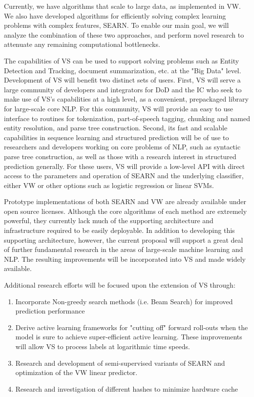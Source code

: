 Currently, we have algorithms that scale to large data, as implemented in \ac{VW}. We also have developed algorithms for efficiently solving complex learning problems with complex features, \ac{SEARN}. To enable our main goal, we will analyze the combination of these two approaches, and perform novel research to attenuate any remaining computational bottlenecks.

The capabilities of \ac{VS} can be used to support solving problems such as Entity Detection and Tracking, document summarization, etc. at the "Big Data" level. Development of \ac{VS} will benefit two distinct sets of users. First, \ac{VS} will serve a large community of developers and integrators for DoD and the IC who seek to make use of \ac{VS}'s capabilities at a high level, as a convenient, prepackaged library for large-scale core \ac{NLP}. For this community, \ac{VS} will provide an easy to use interface to routines for tokenization, part-of-speech tagging, chunking and named entity resolution, and parse tree construction. Second, its fast and scalable capabilities in sequence learning and structured prediction will be of use to researchers and developers working on core problems of \ac{NLP}, such as syntactic parse tree construction, as well as those with a research interest in structured prediction generally. For these users, \ac{VS} will provide a low-level \ac{API} with direct access to the parameters and operation of \ac{SEARN} and the underlying classifier, either \ac{VW} or other options such as logistic regression or linear \ac{SVM}s.


Prototype implementations of both \ac{SEARN} and \ac{VW} are already available under open source licenses. Although the core algorithms of each method are extremely powerful, they currently lack much of the supporting architecture and infrastructure required to be easily deployable. In addition to developing this supporting architecture, however, the current proposal will support a great deal of further fundamental research in the areas of large-scale machine learning and \ac{NLP}. The resulting improvements will be incorporated into \ac{VS} and made widely available. 

Additional research efforts will be focused upon the extension of VS through:

\begin{enumerate}
    \item Incorporate Non-greedy search methods (i.e. Beam Search) for improved prediction performance

    \item Derive active learning frameworks for "cutting off" forward roll-outs when the model is sure to achieve super-efficient active learning. These improvements will allow \ac{VS} to process labels at logarithmic time speeds.

    \item Research and development of semi-supervised variants of \ac{SEARN} and optimization of the \ac{VW} linear predictor.

    \item  Research and investigation of different hashes to minimize hardware cache

\end{enumerate}

